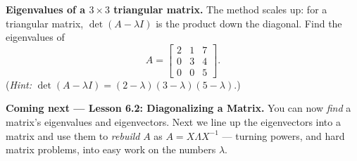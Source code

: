 \documentclass[10pt]{article}
\begin{document}
\begin{extensionbox}
\textbf{Eigenvalues of a $3\times3$ triangular matrix.} The method scales up: for a triangular matrix,
$\det(A-\lambda I)$ is the product down the diagonal. Find the eigenvalues of
\[
  A=\begin{bmatrix} 2 & 1 & 7 \\ 0 & 3 & 4 \\ 0 & 0 & 5 \end{bmatrix}.
\]
(\emph{Hint:} $\det(A-\lambda I)=(2-\lambda)(3-\lambda)(5-\lambda)$.) 
\end{extensionbox}

\begin{spiralbox}
\textbf{Coming next --- Lesson 6.2: Diagonalizing a Matrix.} You can now \emph{find} a matrix's
eigenvalues and eigenvectors. Next we line up the eigenvectors into a matrix and use them to
\emph{rebuild} $A$ as $A=X\Lambda X^{-1}$ --- turning powers, and hard matrix problems, into easy work
on the numbers $\lambda$.
\end{spiralbox}
\end{document}
